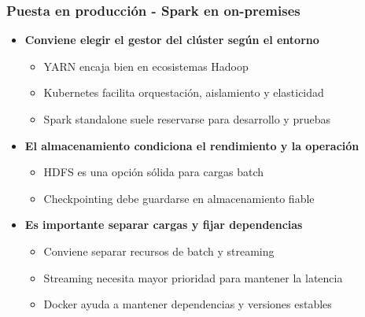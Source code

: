 \documentclass[aspectratio=169]{beamer}
\begin{document}
\begin{frame}\frametitle{Puesta en producción - Spark en on-premises}
\begin{itemize}
  \item \textbf{Conviene elegir el gestor del clúster según el entorno}
  \begin{itemize}
    \item YARN encaja bien en ecosistemas Hadoop
    \item Kubernetes facilita orquestación, aislamiento y elasticidad
    \item Spark standalone suele reservarse para desarrollo y pruebas
  \end{itemize}

  \vspace{0.8em}

  \item \textbf{El almacenamiento condiciona el rendimiento y la operación}
  \begin{itemize}
    \item HDFS es una opción sólida para cargas batch
    \item Checkpointing debe guardarse en almacenamiento fiable
  \end{itemize}

  \vspace{0.8em}

  \item \textbf{Es importante separar cargas y fijar dependencias}
  \begin{itemize}
    \item Conviene separar recursos de batch y streaming
    \item Streaming necesita mayor prioridad para mantener la latencia
    \item Docker ayuda a mantener dependencias y versiones estables
  \end{itemize}
\end{itemize}
\end{frame}
\end{document}
